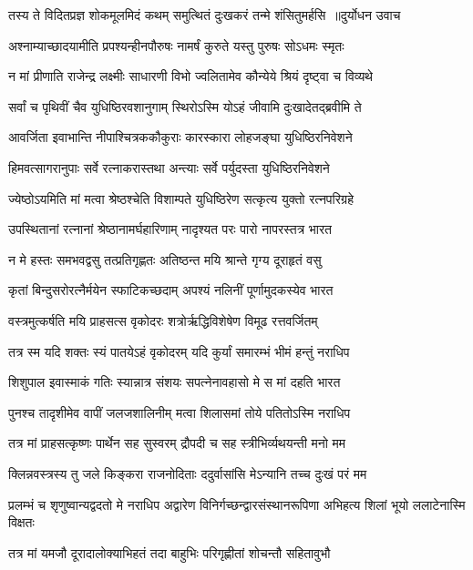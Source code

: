 \twolineshloka
{तस्य ते विदितप्रज्ञ शोकमूलमिदं कथम्}
{समुत्थितं दुःखकरं तन्मे शंसितुमर्हसि ॥दुर्योधन उवाच}


\twolineshloka
{अश्नाम्याच्छादयामीति प्रपश्यन्हीनपौरुषः}
{नामर्षं कुरुते यस्तु पुरुषः सोऽधमः स्मृतः}


\twolineshloka
{न मां प्रीणाति राजेन्द्र लक्ष्मीः साधारणी विभो}
{ज्वलितामेव कौन्येये श्रियं दृष्ट्वा च विव्यथे}


\threelineshloka
{सर्वां च पृथिवीं चैव युधिष्ठिरवशानुगाम्}
{स्थिरोऽस्मि योऽहं जीवामि दुःखादेतद्ब्रवीमि ते}
{}


\twolineshloka
{आवर्जिता इवाभान्ति नीपाश्चित्रककौकुराः}
{कारस्कारा लोहजङ्घा युधिष्ठिरनिवेशने}


\twolineshloka
{हिमवत्सागरानुपाः सर्वे रत्नाकरास्तथा}
{अन्त्याः सर्वे पर्युदस्ता युधिष्ठिरनिवेशने}


\twolineshloka
{ज्येष्ठोऽयमिति मां मत्वा श्रेष्ठश्चेति विशाम्पते}
{युधिष्ठिरेण सत्कृत्य युक्तो रत्नपरिग्रहे}


\twolineshloka
{उपस्थितानां रत्नानां श्रेष्ठानामर्घहारिणाम्}
{नादृश्यत परः पारो नापरस्तत्र भारत}


\twolineshloka
{न मे हस्तः समभवद्वसु तत्प्रतिगृह्णतः}
{अतिष्ठन्त मयि श्रान्ते गृग्य दूराहृतं वसु}


\twolineshloka
{कृतां बिन्दुसरोरत्नैर्मयेन स्फाटिकच्छदाम्}
{अपश्यं नलिनीं पूर्णामुदकस्येव भारत}


\twolineshloka
{वस्त्रमुत्कर्षति मयि प्राहसत्स वृकोदरः}
{शत्रोर्ऋद्धिविशेषेण विमूढ रत्तवर्जितम्}


\twolineshloka
{तत्र स्म यदि शक्तः स्यं पातयेऽहं वृकोदरम्}
{यदि कुर्यां समारम्भं भीमं हन्तुं नराधिप}


\twolineshloka
{शिशुपाल इवास्माकं गतिः स्यान्नात्र संशयः}
{सपत्नेनावहासो मे स मां दहति भारत}


\twolineshloka
{पुनश्च तादृशीमेव वापीं जलजशालिनीम्}
{मत्वा शिलासमां तोये पतितोऽस्मि नराधिप}


\twolineshloka
{तत्र मां प्राहसत्कृष्णः पार्थेन सह सुस्वरम्}
{द्रौपदी च सह स्त्रीभिर्व्यथयन्ती मनो मम}


\twolineshloka
{क्लिन्नवस्त्रस्य तु जले किङ्करा राजनोदिताः}
{ददुर्वासांसि मेऽन्यानि तच्च दुःखं परं मम}


\threelineshloka
{प्रलम्भं च शृणुष्वान्यद्वदतो मे नराधिप}
{अद्वारेण विनिर्गच्छन्द्वारसंस्थानरूपिणा}
{अभिहत्य शिलां भूयो ललाटेनास्मि विक्षतः}


\twolineshloka
{तत्र मां यमजौ दूरादालोक्याभिहतं तदा}
{बाहुभिः परिगृह्णीतां शोचन्तौ सहितावुभौ}


